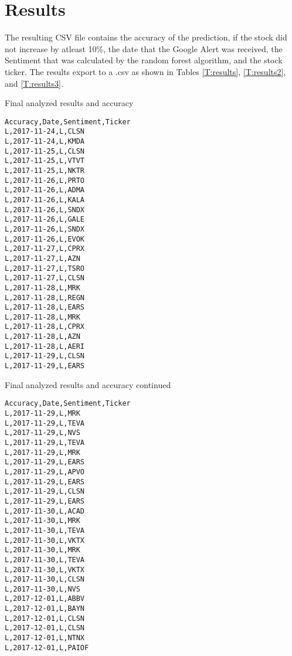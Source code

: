 \documentclass[sigconf]{acmart}
\begin{document}
\section{Results}
The resulting CSV file contains the accuracy of the prediction, if the stock did not increase by atleast 10\%, the date that the Google Alert was received, the Sentiment that was calculated by the random forest algorithm, and the stock ticker. The results export to a .csv as shown in Tables \ref{T:results}, \ref{T:results2}, and \ref{T:results3}.
\begin{table}[htb]
\caption{Final analyzed results and accuracy}\label{T:results}
\begin{verbatim}
Accuracy,Date,Sentiment,Ticker
L,2017-11-24,L,CLSN
L,2017-11-24,L,KMDA
L,2017-11-25,L,CLSN
L,2017-11-25,L,VTVT
L,2017-11-25,L,NKTR
L,2017-11-26,L,PRTO
L,2017-11-26,L,ADMA
L,2017-11-26,L,KALA
L,2017-11-26,L,SNDX
L,2017-11-26,L,GALE
L,2017-11-26,L,SNDX
L,2017-11-26,L,EVOK
L,2017-11-27,L,CPRX
L,2017-11-27,L,AZN
L,2017-11-27,L,TSRO
L,2017-11-27,L,CLSN
L,2017-11-28,L,MRK
L,2017-11-28,L,REGN
L,2017-11-28,L,EARS
L,2017-11-28,L,MRK
L,2017-11-28,L,CPRX
L,2017-11-28,L,AZN
L,2017-11-28,L,AERI
L,2017-11-29,L,CLSN
L,2017-11-29,L,EARS
\end{verbatim}
\end{table}

\begin{table}[htb]
\caption{Final analyzed results and accuracy continued}\label{T:results2}
\begin{verbatim}
Accuracy,Date,Sentiment,Ticker
L,2017-11-29,L,MRK
L,2017-11-29,L,TEVA
L,2017-11-29,L,NVS
L,2017-11-29,L,TEVA
L,2017-11-29,L,MRK
L,2017-11-29,L,EARS
L,2017-11-29,L,APVO
L,2017-11-29,L,EARS
L,2017-11-29,L,CLSN
L,2017-11-29,L,EARS
L,2017-11-30,L,ACAD
L,2017-11-30,L,MRK
L,2017-11-30,L,TEVA
L,2017-11-30,L,VKTX
L,2017-11-30,L,MRK
L,2017-11-30,L,TEVA
L,2017-11-30,L,VKTX
L,2017-11-30,L,CLSN
L,2017-11-30,L,NVS
L,2017-12-01,L,ABBV
L,2017-12-01,L,BAYN
L,2017-12-01,L,CLSN
L,2017-12-01,L,CLSN
L,2017-12-01,L,NTNX
L,2017-12-01,L,PAIOF
\end{verbatim}
\end{table}
\end{document}
